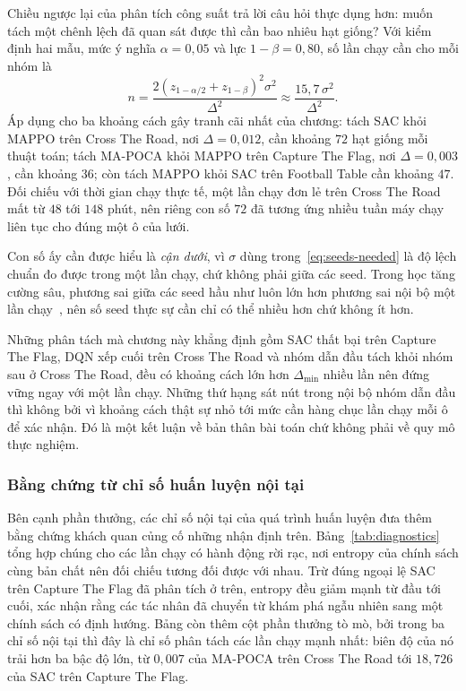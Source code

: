 \indent Chiều ngược lại của phân tích công suất trả lời câu hỏi thực dụng hơn: muốn tách một
chênh lệch đã quan sát được thì cần bao nhiêu hạt giống? Với kiểm định hai mẫu, mức ý nghĩa
$\alpha = 0{,}05$ và lực $1 - \beta = 0{,}80$, số lần chạy cần cho mỗi nhóm là
\begin{equation}
n = \frac{2\left(z_{1-\alpha/2} + z_{1-\beta}\right)^{2}\sigma^{2}}{\Delta^{2}}
  \approx \frac{15{,}7\,\sigma^{2}}{\Delta^{2}} .
\label{eq:seeds-needed}
\end{equation}
Áp dụng cho ba khoảng cách gây tranh cãi nhất của chương: tách SAC khỏi MAPPO trên Cross The
Road, nơi $\Delta = 0{,}012$, cần khoảng $72$ hạt giống mỗi thuật toán; tách MA-POCA khỏi
MAPPO trên Capture The Flag, nơi $\Delta = 0{,}003$, cần khoảng $36$; còn tách MAPPO khỏi SAC
trên Football Table cần khoảng $47$. Đối chiếu với thời gian chạy thực tế, một lần chạy đơn
lẻ trên Cross The Road mất từ $48$ tới $148$ phút, nên riêng con số $72$ đã tương ứng nhiều
tuần máy chạy liên tục cho đúng một ô của lưới.

\indent Con số ấy cần được hiểu là \emph{cận dưới}, vì $\sigma$ dùng trong~\eqref{eq:seeds-needed}
là độ lệch chuẩn đo được trong một lần chạy, chứ không phải giữa các seed. Trong học tăng cường sâu, phương sai giữa các seed hầu
như luôn lớn hơn phương sai nội bộ một lần chạy~\cite{henderson2018matters}, nên số seed
thực sự cần chỉ có thể nhiều hơn chứ không ít hơn.

\indent Những phân tách mà chương này khẳng
định gồm SAC thất bại trên Capture The Flag, DQN xếp cuối trên Cross The Road và nhóm dẫn
đầu tách khỏi nhóm sau ở Cross The Road, đều có khoảng cách lớn hơn $\Delta_{\min}$ nhiều
lần nên đứng vững ngay với một lần chạy. Những thứ hạng sát nút trong nội bộ nhóm dẫn đầu
thì không bởi vì khoảng
cách thật sự nhỏ tới mức cần hàng chục lần chạy mỗi ô để xác nhận. Đó là một kết luận về bản
thân bài toán chứ không phải về quy mô thực nghiệm.

\subsubsection{Bằng chứng từ chỉ số huấn luyện nội tại}
\indent Bên cạnh phần thưởng, các chỉ số nội tại của quá trình huấn luyện đưa thêm bằng
chứng khách quan củng cố những nhận định trên. Bảng~\ref{tab:diagnostics} tổng hợp chúng
cho các lần chạy có hành động rời rạc, nơi entropy của chính sách cùng bản chất nên đối
chiếu tương đối được với nhau. Trừ đúng ngoại lệ SAC trên Capture The Flag đã phân tích ở
trên, entropy đều giảm mạnh từ đầu tới cuối, xác nhận rằng các tác nhân đã chuyển từ khám
phá ngẫu nhiên sang một chính sách có định hướng. Bảng còn thêm cột phần thưởng tò mò, bởi
trong ba chỉ số nội tại thì đây là chỉ số phân tách các lần chạy mạnh nhất: biên độ của nó
trải hơn ba bậc độ lớn, từ $0{,}007$ của MA-POCA trên Cross The Road tới $18{,}726$ của
SAC trên Capture The Flag.

